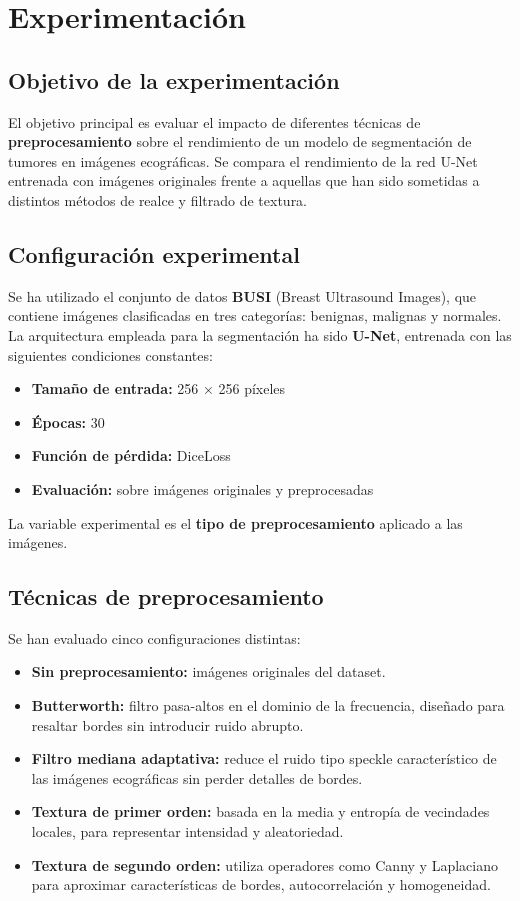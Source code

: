 \documentclass[12pt]{article}
\begin{document}
\section{Experimentación}

\subsection{Objetivo de la experimentación}
El objetivo principal es evaluar el impacto de diferentes técnicas de \textbf{preprocesamiento} sobre el rendimiento de un modelo de segmentación de tumores en imágenes ecográficas. Se compara el rendimiento de la red U-Net entrenada con imágenes originales frente a aquellas que han sido sometidas a distintos métodos de realce y filtrado de textura.

\subsection{Configuración experimental}
Se ha utilizado el conjunto de datos \textbf{BUSI} (Breast Ultrasound Images), que contiene imágenes clasificadas en tres categorías: benignas, malignas y normales. La arquitectura empleada para la segmentación ha sido \textbf{U-Net}, entrenada con las siguientes condiciones constantes:
\begin{itemize}
    \item \textbf{Tamaño de entrada:} 256 × 256 píxeles
    \item \textbf{Épocas:} 30
    \item \textbf{Función de pérdida:} DiceLoss
    \item \textbf{Evaluación:} sobre imágenes originales y preprocesadas
\end{itemize}
La variable experimental es el \textbf{tipo de preprocesamiento} aplicado a las imágenes.

\subsection{Técnicas de preprocesamiento}
Se han evaluado cinco configuraciones distintas:
\begin{itemize}
    \item \textbf{Sin preprocesamiento:} imágenes originales del dataset.
    \item \textbf{Butterworth:} filtro pasa-altos en el dominio de la frecuencia, diseñado para resaltar bordes sin introducir ruido abrupto.
    \item \textbf{Filtro mediana adaptativa:} reduce el ruido tipo speckle característico de las imágenes ecográficas sin perder detalles de bordes.
    \item \textbf{Textura de primer orden:} basada en la media y entropía de vecindades locales, para representar intensidad y aleatoriedad.
    \item \textbf{Textura de segundo orden:} utiliza operadores como Canny y Laplaciano para aproximar características de bordes, autocorrelación y homogeneidad.
\end{itemize}
\end{document}
